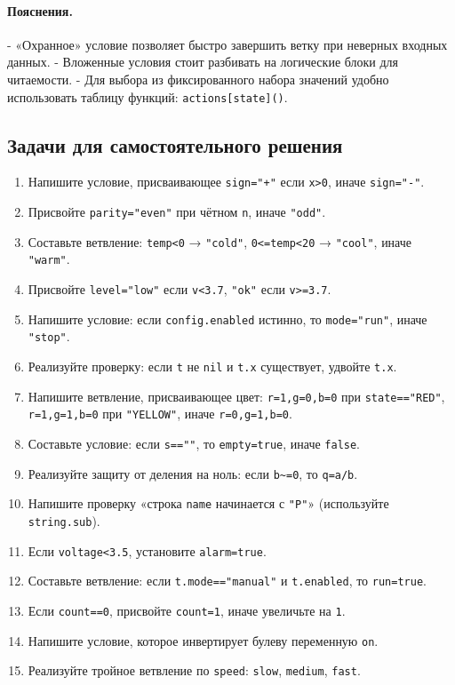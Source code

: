 \paragraph{Пояснения.}
- «Охранное» условие позволяет быстро завершить ветку при неверных входных данных.
- Вложенные условия стоит разбивать на логические блоки для читаемости.
- Для выбора из фиксированного набора значений удобно использовать таблицу функций: \verb|actions[state]()|.
\subsection*{Задачи для самостоятельного решения}
\begin{enumerate}
  \item Напишите условие, присваивающее \verb|sign="+"| если \verb|x>0|, иначе \verb|sign="-"|.
  \item Присвойте \verb|parity="even"| при чётном \verb|n|, иначе \verb|"odd"|.
  \item Составьте ветвление: \verb|temp<0| → \verb|"cold"|, \verb|0<=temp<20| → \verb|"cool"|, иначе \verb|"warm"|.
  \item Присвойте \verb|level="low"| если \verb|v<3.7|, \verb|"ok"| если \verb|v>=3.7|.
  \item Напишите условие: если \verb|config.enabled| истинно, то \verb|mode="run"|, иначе \verb|"stop"|.
  \item Реализуйте проверку: если \verb|t| не \verb|nil| и \verb|t.x| существует, удвойте \verb|t.x|.
  \item Напишите ветвление, присваивающее цвет: \verb|r=1,g=0,b=0| при \verb|state=="RED"|, \verb|r=1,g=1,b=0| при \verb|"YELLOW"|, иначе \verb|r=0,g=1,b=0|.
  \item Составьте условие: если \verb|s==""|, то \verb|empty=true|, иначе \verb|false|.
  \item Реализуйте защиту от деления на ноль: если \verb|b~=0|, то \verb|q=a/b|.
  \item Напишите проверку «строка \verb|name| начинается с \verb|"P"|» (используйте \verb|string.sub|).
  \item Если \verb|voltage<3.5|, установите \verb|alarm=true|.
  \item Составьте ветвление: если \verb|t.mode=="manual"| и \verb|t.enabled|, то \verb|run=true|.
  \item Если \verb|count==0|, присвойте \verb|count=1|, иначе увеличьте на \verb|1|.
  \item Напишите условие, которое инвертирует булеву переменную \verb|on|.
  \item Реализуйте тройное ветвление по \verb|speed|: \verb|slow|, \verb|medium|, \verb|fast|.
\end{enumerate}

